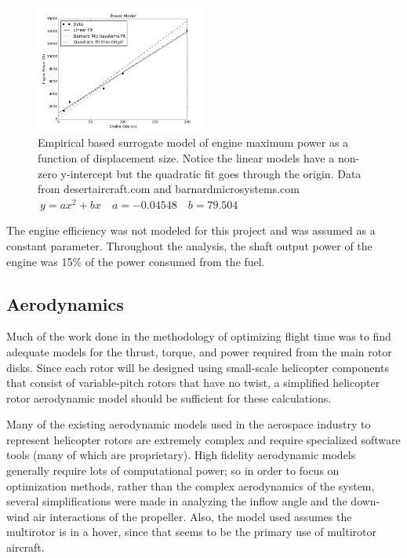 \documentclass[letterpaper, 10 pt, conference]{ieeeconf}  %
\begin{document}
\begin{figure}
	\includegraphics[width=0.5\textwidth]{max_power.png}
	\caption{Empirical based surrogate model of engine maximum power as a function of displacement size. Notice the linear models have a non-zero y-intercept but the quadratic fit goes through the origin. Data from desertaircraft.com \cite{da2016} and barnardmicrosystems.com \cite{barnardmiro2016} $\ y = ax^2 + bx \quad a = -0.04548 \quad b = 79.504$}
		\label{fig:power}
\end{figure}


The engine efficiency was not modeled for this project and was assumed as a constant parameter.  Throughout the analysis, the shaft output power of the engine was 15\% of the power consumed from the fuel.  

\subsection{Aerodynamics}

Much of the work done in the methodology of optimizing flight time was to find adequate models for the thrust, torque, and power required from the main rotor disks. Since each rotor will be designed using small-scale helicopter components that consist of variable-pitch rotors that have no twist, a simplified helicopter rotor aerodynamic model should be sufficient for these calculations. 

Many of the existing aerodynamic models used in the aerospace industry to represent helicopter rotors are extremely complex and require specialized software tools (many of which are proprietary). High fidelity aerodynamic models generally require lots of computational power; so in order to focus on optimization methods, rather than the complex aerodynamics of the system, several simplifications were made in analyzing the inflow angle and the down-wind air interactions of the propeller. Also, the model used assumes the multirotor is in a hover, since that seems to be the primary use of multirotor aircraft.
\end{document}
